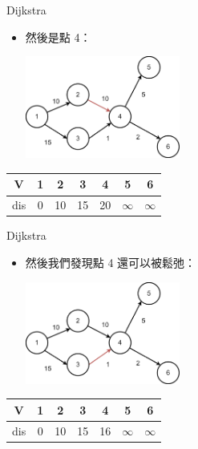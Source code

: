 \documentclass[aspectratio=169]{beamer}
\begin{document}
    \begin{frame}{Dijkstra}
        \begin{itemize}
            \item 然後是點 4：
            \begin{center}
                \includegraphics[width=0.4\textwidth]{src/dijkstra_4.png}
            \end{center}
        \end{itemize}

        \begin{center}
            \begin{tabular}{c|c|c|c|c|c|c}
                V & 1 & 2 & 3 & 4 & 5 & 6 \\
                \hline
                dis & 0 & 10 & 15 & 20 & $\infty$ & $\infty$
            \end{tabular}
        \end{center}
    \end{frame}

    \begin{frame}{Dijkstra}
        \begin{itemize}
            \item 然後我們發現點 4 還可以被鬆弛：
            \begin{center}
                \includegraphics[width=0.4\textwidth]{src/dijkstra_5.png}
            \end{center}
        \end{itemize}

        \begin{center}
            \begin{tabular}{c|c|c|c|c|c|c}
                V & 1 & 2 & 3 & 4 & 5 & 6 \\
                \hline
                dis & 0 & 10 & 15 & 16 & $\infty$ & $\infty$
            \end{tabular}
        \end{center}
    \end{frame}
\end{document}
